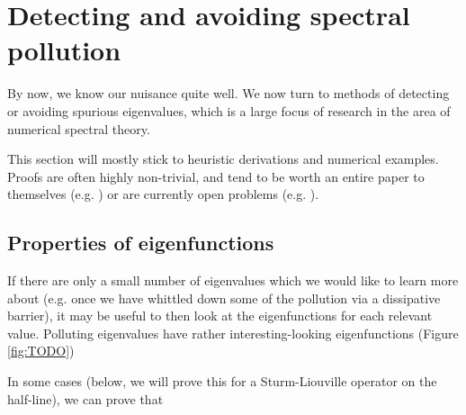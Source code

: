 \documentclass[../main.tex]{subfiles}
\begin{document}
\section{Detecting and avoiding spectral pollution}

By now, we know our nuisance quite well. We now turn to methods of detecting or
avoiding spurious eigenvalues, which is a large focus of research in the area of
numerical spectral theory.

This section will mostly stick to heuristic derivations and numerical examples.
Proofs are often highly non-trivial, and tend to be worth an entire paper to
themselves (e.g. \cite{soussi2006convergence}) or are currently open problems
(e.g. \cite{chandler-wilde2012spectrum}).

\subsection{Properties of eigenfunctions}

If there are only a small number of eigenvalues which we would like to learn
more about (e.g. once we have whittled down some of the pollution via a
dissipative barrier), it may be useful to then look at the eigenfunctions for
each relevant value. Polluting eigenvalues have rather interesting-looking
eigenfunctions (Figure \ref{fig:TODO})

In some cases (below, we will prove this for a Sturm-Liouville operator on the
half-line), we can prove that
\end{document}
